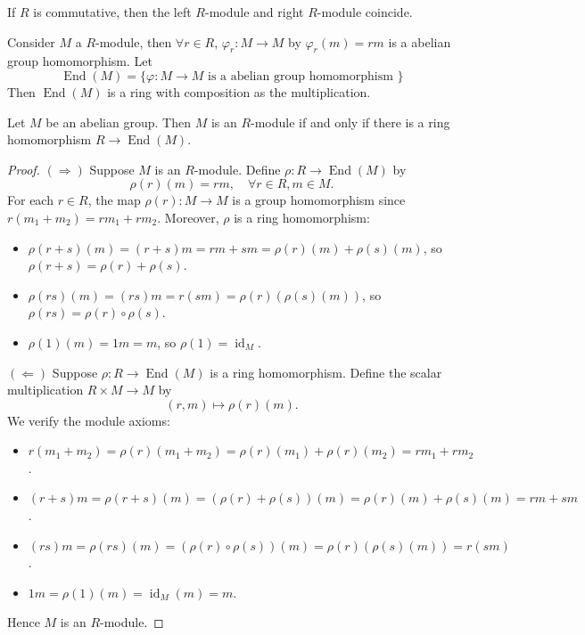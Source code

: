 \documentclass[11pt, a4paper]{report}
\begin{document}
\begin{remark}
If $R$ is commutative, then the left $R$-module and right $R$-module coincide.
\end{remark}

Consider $ M $ a $ R $-module, then $ \forall r \in R $, $ \varphi_r: M \rightarrow M $ by $ \varphi_r(m) = rm $ is a abelian group homomorphism. Let
\[
\operatorname{End}(M) = \{ \varphi: M \rightarrow M \text{ is a abelian group homomorphism } \}
\]        
Then $ \operatorname{End}(M) $ is a ring with composition as the multiplication.

\begin{theorem}
Let $M$ be an abelian group. Then $M$ is an $R$-module if and only if there is a ring homomorphism $R \rightarrow \operatorname{End}(M)$.
\end{theorem}

\begin{proof}
$(\Rightarrow)$ Suppose $M$ is an $R$-module. Define $\rho: R \rightarrow \operatorname{End}(M)$ by
\[
\rho(r)(m) = rm, \quad \forall r \in R, m \in M.
\]
For each $r \in R$, the map $\rho(r): M \rightarrow M$ is a group homomorphism since $r(m_1 + m_2) = rm_1 + rm_2$. Moreover, $\rho$ is a ring homomorphism:
\begin{itemize}
    \item $\rho(r + s)(m) = (r + s)m = rm + sm = \rho(r)(m) + \rho(s)(m)$, so $\rho(r + s) = \rho(r) + \rho(s)$.
    \item $\rho(rs)(m) = (rs)m = r(sm) = \rho(r)(\rho(s)(m))$, so $\rho(rs) = \rho(r) \circ \rho(s)$.
    \item $\rho(1)(m) = 1m = m$, so $\rho(1) = \operatorname{id}_M$.
\end{itemize}

$(\Leftarrow)$ Suppose $\rho: R \rightarrow \operatorname{End}(M)$ is a ring homomorphism. Define the scalar multiplication $R \times M \rightarrow M$ by
\[
(r, m) \mapsto \rho(r)(m).
\]
We verify the module axioms:
\begin{itemize}
    \item $r(m_1 + m_2) = \rho(r)(m_1 + m_2) = \rho(r)(m_1) + \rho(r)(m_2) = rm_1 + rm_2$.
    \item $(r + s)m = \rho(r + s)(m) = (\rho(r) + \rho(s))(m) = \rho(r)(m) + \rho(s)(m) = rm + sm$.
    \item $(rs)m = \rho(rs)(m) = (\rho(r) \circ \rho(s))(m) = \rho(r)(\rho(s)(m)) = r(sm)$.
    \item $1m = \rho(1)(m) = \operatorname{id}_M(m) = m$.
\end{itemize}
Hence $M$ is an $R$-module.
\end{proof}
\end{document}

